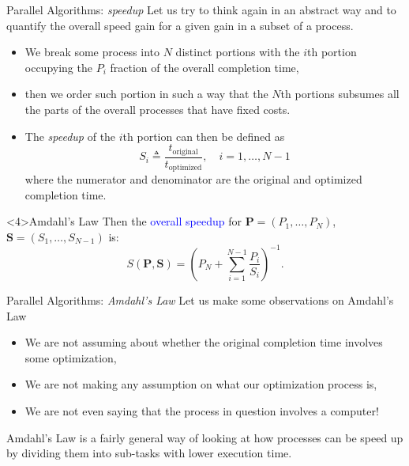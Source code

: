 \documentclass[xcolor={svgnames,usenames}]{beamer}
\begin{document}
\begin{frame}{Parallel Algorithms: \emph{speedup}}\vspace{-0.8em}
\small
Let us try to think again in an abstract way and to quantify the \alert{overall speed gain} for a given gain in a subset of a process.
\begin{itemize}
	\item<1-> We break some process into $N$ distinct portions with the $i$th portion occupying the $P_i$ fraction of the overall completion time,
	\item<2-> then we order such portion in such a way that the $N$th portions subsumes all the parts of the overall processes that have fixed costs.
	\item<3-> The \emph{speedup} of the $i$th portion can then be defined as 
	\begin{equation*}
		S_i \triangleq \frac{t_{\text{original}}}{t_{\text{optimized}}}, \quad i=1,\ldots,N-1
	\end{equation*}
	where the numerator and denominator are the original and optimized completion time.
\end{itemize}
\begin{block}<4>{Amdahl's Law}
Then the \textcolor{blue}{overall speedup} for $\mathbf{P} = (P_1,\ldots,P_N)$, $\mathbf{S} = (S_1,\ldots,S_{N-1})$ is:
\begin{equation*}
S(\mathbf{P},\mathbf{S}) = \left(P_N + \sum_{i=1}^{N-1} \frac{P_i}{S_i}\right)^{-1}.
\end{equation*}
\end{block}

\end{frame}

\begin{frame}{Parallel Algorithms: \emph{Amdahl's Law}}
Let us make some observations on Amdahl's Law
\begin{itemize}
	\item We are not assuming about whether the original completion time  involves some optimization,
	\item We are not making any assumption on what our optimization process is,
	\item We are not even saying that the process in question involves a computer!
\end{itemize}
Amdahl's Law is a fairly general way of looking at how processes can be speed up by dividing them into sub-tasks with lower execution time. 

\end{frame}
\end{document}
